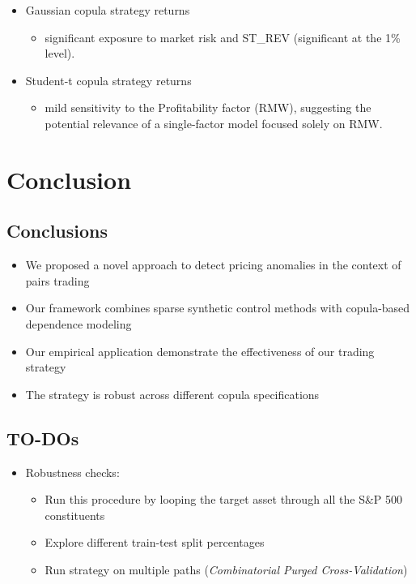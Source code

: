 \documentclass[
  letterpaper,
  DIV=11,
  numbers=noendperiod]{scrartcl}
\providecommand{\tightlist}{%
  \setlength{\itemsep}{0pt}\setlength{\parskip}{0pt}}\usepackage{longtable,booktabs,array}
\begin{document}
\begin{itemize}
\tightlist
\item
  Gaussian copula strategy returns

  \begin{itemize}
  \tightlist
  \item
    significant exposure to market risk and ST\_REV (significant at the
    1\% level).
  \end{itemize}
\end{itemize}

\begin{itemize}
\tightlist
\item
  Student-t copula strategy returns

  \begin{itemize}
  \tightlist
  \item
    mild sensitivity to the Profitability factor (RMW), suggesting the
    potential relevance of a single-factor model focused solely on RMW.
  \end{itemize}
\end{itemize}

\section{Conclusion}\label{conclusion}

\subsection{Conclusions}\label{conclusions}

\begin{itemize}
\tightlist
\item
  We proposed a novel approach to detect pricing anomalies in the
  context of pairs trading
\item
  Our framework combines sparse synthetic control methods with
  copula-based dependence modeling
\item
  Our empirical application demonstrate the effectiveness of our trading
  strategy
\item
  The strategy is robust across different copula specifications
\end{itemize}

\subsection{TO-DOs}\label{to-dos}

\begin{itemize}
\tightlist
\item
  Robustness checks:

  \begin{itemize}
  \tightlist
  \item
    Run this procedure by looping the target asset through all the S\&P
    500 constituents
  \item
    Explore different train-test split percentages
  \item
    Run strategy on multiple paths (\emph{Combinatorial Purged
    Cross-Validation})
  \end{itemize}
\end{itemize}
\end{document}

